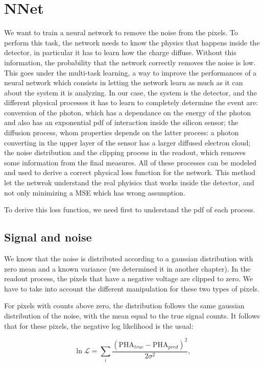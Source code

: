 \chapter{NNet}
\label{chap:nnet}


We want to train a neural network to remove the noise from the pixels. To perform this task, the network needs to know the physics that happens inside the detector, in particular it has to learn how the charge diffuse. Without this information, the probability that the network correctly removes the noise is low. This goes under the multi-task learning, a way to improve the performances of a neural network which consists in letting the network learn as much as it can about the system it is analyzing. In our case, the system is the detector, and the different physical processes it has to learn to completely determine the event are: conversion of the photon, which has a dependance on the energy of the photon and also has an exponential pdf of interaction inside the silicon sensor; the diffusion process, whom properties depends on the latter process: a photon converting in the upper layer of the sensor has  a larger diffused electron cloud; the noise distribution and the clipping process in the readout, which removes some information from the final measures. All of these processes can be modeled and used to derive a correct physical loss function for the network. This method let the netwrok understand the real phyisics that works inside the detector, and not only minimizing a MSE which has wrong assumption.

To derive this loss function, we need first to understand the pdf of each process.

\section{Signal and noise}
We know that the noise is distributed according to a gaussian distribution with zero mean and a known variance (we determined it in another chapter). In the readout process, the pixels that have a negative voltage are clipped to zero. We have to take into account the different manipulation for these two types of pixels.

For pixels with counts above zero, the distribution follows the same gaussian distribution of the noise, with the mean equal to the true signal counts. It follows that for these pixels, the negative log likelihood is the usual:

\begin{equation}
\ln \mathcal{L} = \sum_i \frac{(\textrm{PHA}_{true} - \textrm{PHA}_{pred})^2}{2\sigma^2},
\end{equation}

